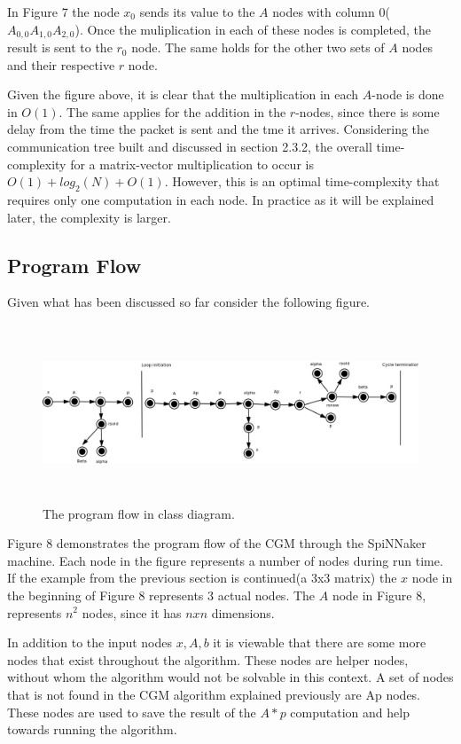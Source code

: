 \documentclass[12pt,a4paper]{article}
\begin{document}
In Figure 7 the node $x_0$ sends its value to the $A$ nodes with column 0($A_{0,0} A_{1,0} A_{2,0}$). Once the muliplication in each of these nodes is completed, the result is sent to the $r_0$ node. The same holds for the other two sets of $A$ nodes and their respective $r$ node. 

Given the figure above, it is clear that the multiplication in each $A$-node is done in $O(1)$. The same applies for the addition in the $r$-nodes, since there is some delay from the time the packet is sent and the tme it arrives. Considering the communication tree built and discussed in section 2.3.2, the overall time-complexity for a matrix-vector multiplication to occur is $O(1)+log_2(N)+O(1)$. However, this is an optimal time-complexity that requires only one computation in each node. In practice as it will be explained later, the complexity is larger.
\subsection{Program Flow}
Given what has been discussed so far consider the following figure.
\begin{figure}[h!]
\includegraphics[width=500pt,height=150pt,scale=1]{Pics/program_flow.png}
\centering
\caption{The program flow in class diagram.}
\end{figure}
Figure 8 demonstrates the program flow of the CGM through the SpiNNaker machine. Each node in the figure represents a number of nodes during run time. If the example from the previous section is continued(a 3x3 matrix) the $x$ node in the beginning of Figure 8 represents 3 actual nodes. The $A$ node in Figure 8, represents $n^2$ nodes, since it has $nxn$ dimensions.

In addition to the input nodes $x,A,b$ it is viewable that there are some more nodes that exist throughout the algorithm. These nodes are helper nodes, without whom the algorithm would not be solvable in this context. A set of nodes that is not found in the CGM algorithm explained previously are Ap nodes. These nodes are used to save the result of the $A*p$ computation and help towards running the algorithm.
\end{document}
